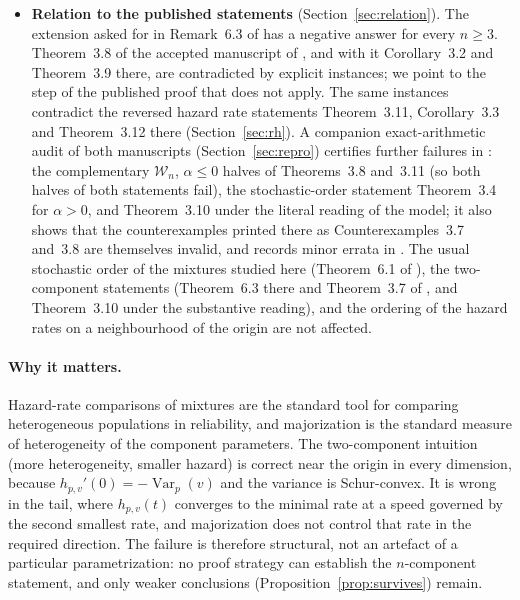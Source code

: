 \documentclass[10pt]{article}
\theoremstyle{plain}
\theoremstyle{definition}
\theoremstyle{remark}
\DeclareMathOperator{\Var}{Var}
\begin{document}
\begin{itemize}
\item[(e)] \textbf{Relation to the published statements} (Section~\ref{sec:relation}). The extension asked for in Remark~6.3 of \cite{ShojaeeAsadiFinkelstein2022} has a negative answer for every $n\ge 3$. Theorem~3.8 of the accepted manuscript of \cite{SahooKayalFinkelstein2026}, and with it Corollary~3.2 and Theorem~3.9 there, are contradicted by explicit instances; we point to the step of the published proof that does not apply. The same instances contradict the reversed hazard rate statements Theorem~3.11, Corollary~3.3 and Theorem~3.12 there (Section~\ref{sec:rh}). A companion exact-arithmetic audit of both manuscripts (Section~\ref{sec:repro}) certifies further failures in \cite{SahooKayalFinkelstein2026}: the complementary $\mathcal W_n$, $\alpha\le0$ halves of Theorems~3.8 and~3.11 (so both halves of both statements fail), the stochastic-order statement Theorem~3.4 for $\alpha>0$, and Theorem~3.10 under the literal reading of the model; it also shows that the counterexamples printed there as Counterexamples~3.7 and~3.8 are themselves invalid, and records minor errata in \cite{ShojaeeAsadiFinkelstein2022}. The usual stochastic order of the mixtures studied here (Theorem~6.1 of \cite{ShojaeeAsadiFinkelstein2022}), the two-component statements (Theorem~6.3 there and Theorem~3.7 of \cite{SahooKayalFinkelstein2026}, and Theorem~3.10 under the substantive reading), and the ordering of the hazard rates on a neighbourhood of the origin are not affected.
\end{itemize}

\paragraph{Why it matters.} Hazard-rate comparisons of mixtures are the standard tool for comparing heterogeneous populations in reliability, and majorization is the standard measure of heterogeneity of the component parameters. The two-component intuition (more heterogeneity, smaller hazard) is correct near the origin in every dimension, because $h_{p,v}'(0)=-\Var_p(v)$ and the variance is Schur-convex. It is wrong in the tail, where $h_{p,v}(t)$ converges to the minimal rate at a speed governed by the second smallest rate, and majorization does not control that rate in the required direction. The failure is therefore structural, not an artefact of a particular parametrization: no proof strategy can establish the $n$-component statement, and only weaker conclusions (Proposition~\ref{prop:survives}) remain.
\end{document}
